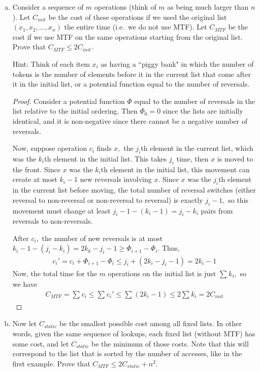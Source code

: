 \documentclass{article}
\begin{document}
\begin{enumerate}[(a)]

	\item Consider a sequence of $m$ operations (think of $m$ as being much larger than $n$).  Let $C_{init}$ be the cost of these operations if we used the original list $(x_1, x_2, \dots, x_n)$ the entire time (i.e.~we do not use MTF).  Let $C_{MTF}$ be the cost if we use MTF on the same operations starting from the original list.  Prove that $C_{MTF} \leq 2 C_{init}$.  

		Hint: Think of each item $x_i$ as having a ``piggy bank" in which the number of tokens is the number of elements before it in the current list that come after it in the initial list, or a potential function equal to the number of reversals.  
		\begin{proof}
			Consider a potential function $\Phi$ equal to the number of reversals in the list relative to the initial ordering. Then $\Phi_0=0$ since the lists are initially identical, and it is non-negative since there cannot be a negative number of reversals.
			
			Now, suppose operation $c_i$ finds $x,$ the $j_i$th element in the current list, which was the $k_i$th element in the initial list. This takes $j_i$ time, then $x$ is moved to the front. Since $x$ was the $k_i$th element in the initial list, this movement can create at most $k_i-1$ new reversals involving $x.$ Since $x$ was the $j_i$th element in the current list before moving, the total number of reversal switches (either reversal to non-reversal or non-reversal to reversal) is exactly $j_i-1,$ so this movement must change at least $j_i-1-(k_i-1)=j_i-k_i$ pairs from reversals to non-reversals. 

			After $c_i,$ the number of new reversals is at most $k_i-1-(j_i-k_i)=2k_k-j_i-1\ge \Phi_{i+1}-\Phi_i.$ Thus,
			\begin{align*}
				c_i' = c_i + \Phi_{i+1}-\Phi_i \le j_i + (2k_i-j_i-1) = 2k_i - 1
			\end{align*}
			Now, the total time for the $m$ operations on the initial list is just $\sum_{}^{}k_i,$ so we have
			\begin{align*}
				C_{MTF}=\sum_{}^{}c_i\le \sum_{}^{}c_i'\le \sum_{}^{}(2k_i-1)\le 2\sum_{}^{}k_i = 2C_{init}
			\end{align*}
		\end{proof}

	\item Now let $C_{static}$ be the smallest possible cost among all fixed lists.  In other words, given the same sequence of lookups, each fixed list (without MTF) has some cost, and let $C_{static}$ be the minimum of those costs.  Note that this will correspond to the list that is sorted by the number of accesses, like in the first example.  Prove that $C_{MTF} \leq 2C_{static} + n^2$.


\end{enumerate}
\end{document}
